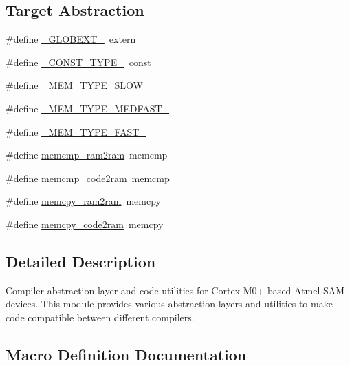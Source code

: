 \subsection*{Target Abstraction}
\begin{DoxyCompactItemize}
\item 
\#define \hyperlink{group__group__sam0__utils_gad4d03be3b8f3d15ed804170a1311ec98}{\+\_\+\+G\+L\+O\+B\+E\+X\+T\+\_\+}~extern
\item 
\#define \hyperlink{group__group__sam0__utils_ga8e0d79d43ad9295d5193ca29f109a762}{\+\_\+\+C\+O\+N\+S\+T\+\_\+\+T\+Y\+P\+E\+\_\+}~const
\item 
\#define \hyperlink{group__group__sam0__utils_ga35d552e8456cfb2b810baa0a9212c98e}{\+\_\+\+M\+E\+M\+\_\+\+T\+Y\+P\+E\+\_\+\+S\+L\+O\+W\+\_\+}
\item 
\#define \hyperlink{group__group__sam0__utils_gadcd997c76f95854090b17513c4ef3891}{\+\_\+\+M\+E\+M\+\_\+\+T\+Y\+P\+E\+\_\+\+M\+E\+D\+F\+A\+S\+T\+\_\+}
\item 
\#define \hyperlink{group__group__sam0__utils_gabf669e579471cadcf68d9ffc440e68b1}{\+\_\+\+M\+E\+M\+\_\+\+T\+Y\+P\+E\+\_\+\+F\+A\+S\+T\+\_\+}
\item 
\#define \hyperlink{group__group__sam0__utils_ga27819e952caa0a535a5901d2857834b7}{memcmp\+\_\+ram2ram}~memcmp
\item 
\#define \hyperlink{group__group__sam0__utils_gab914bad47205a9b7afb9ac53ec71cb55}{memcmp\+\_\+code2ram}~memcmp
\item 
\#define \hyperlink{group__group__sam0__utils_ga9a4ff08e7c4cf79135a3bcbab68472b7}{memcpy\+\_\+ram2ram}~memcpy
\item 
\#define \hyperlink{group__group__sam0__utils_ga55724cc8f7d42eba122dac5bffa00024}{memcpy\+\_\+code2ram}~memcpy
\end{DoxyCompactItemize}


\subsection{Detailed Description}
Compiler abstraction layer and code utilities for Cortex-\/\+M0+ based Atmel S\+A\+M devices. This module provides various abstraction layers and utilities to make code compatible between different compilers. 

\subsection{Macro Definition Documentation}
\hypertarget{group__group__sam0__utils_ga8e0d79d43ad9295d5193ca29f109a762}{}
